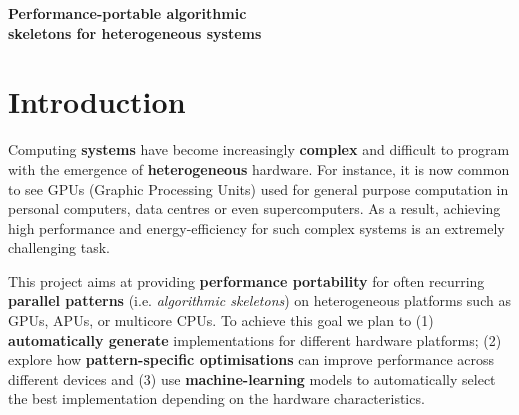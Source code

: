 \documentclass[11pt,a4paper]{article}
\begin{document}
\begin{center}
  \huge\bfseries Performance-portable algorithmic\\ skeletons for heterogeneous systems
\end{center}
\section{Introduction}
Computing \textbf{systems} have become increasingly \textbf{complex} and difficult to program with the emergence of \textbf{heterogeneous} hardware.
For instance, it is now common to see GPUs (Graphic Processing Units) used for general purpose computation in personal computers, data centres or even supercomputers.
As a result, achieving high performance and energy-efficiency for such complex systems is an extremely challenging task.

This project aims at providing \textbf{performance portability} for often recurring \textbf{parallel patterns} (i.e. \emph{algorithmic skeletons}) on heterogeneous platforms such as GPUs, APUs, or multicore CPUs.
To achieve this goal we plan to (1) \textbf{automatically generate} implementations for different hardware platforms;\linebreak
(2) explore how \textbf{pattern-specific optimisations} can improve performance across different devices and
(3) use \textbf{machine-learning} models to automatically select the best implementation depending on the hardware characteristics.
\end{document}
